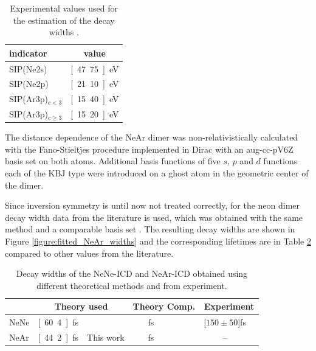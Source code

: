 \begin{table}[h]
 \caption{Experimental values used for the estimation of the decay widths
          \cite{Fasshauer14_1}.}
 \label{exp_input}
 \centering
 \begin{tabular}{lc}
  \toprule
  indicator            &  value \\
  \midrule
  SIP(Ne2s)            &  \unit[47.75]{eV} \\
  SIP(Ne2p)            &  \unit[21.10]{eV} \\
  SIP(Ar3p)$_{c<3}$    &  \unit[15.40]{eV} \\
  SIP(Ar3p)$_{c\ge 3}$ &  \unit[15.20]{eV} \\
  \bottomrule
 \end{tabular}
\end{table}

The distance dependence of the NeAr dimer was non-relativistically calculated with
the Fano-Stieltjes procedure implemented in Dirac \cite{DIRAC13,Fasshauer14_2}
with an aug-cc-pV6Z basis set on both atoms. 
Additional basis functions of five $s$, $p$ and $d$ functions each of the
KBJ type \cite{Kaufmann89} were introduced on a ghost atom in the
geometric center of the dimer.

Since inversion symmetry is until now not treated correctly,
for the neon dimer decay width data from the literature is used, which was
obtained with the same method and a comparable basis set \cite{Averbukh06_1}.
The resulting decay widths are shown in Figure \ref{figure:fitted_NeAr_widths}
and the corresponding lifetimes are in Table \ref{table:NeAr_gammas} compared
to other values from the literature.

\begin{table}[htb]
 \centering
 \caption{Decay widths of the NeNe-ICD and NeAr-ICD obtained
          using different theoretical
          methods and from experiment.}
 \begin{tabular}{lcrcrcr}
  \toprule
        & \multicolumn{2}{c}{Theory used} & \multicolumn{2}{c}{Theory Comp.} & \multicolumn{2}{c}{Experiment} \\
  \midrule
   NeNe & \unit[60.4]{fs} & \cite{Averbukh06_1} & \unit[92]{fs} & \cite{Vaval07} & \unit[$150\pm 50$]{fs} & \cite{Schnorr13}\\
   NeAr & \unit[44.2]{fs} & This work & \unit[36]{fs} & \cite{Scheit06} &  --  &\\
  \bottomrule
 \end{tabular}
 \label{table:NeAr_gammas}
\end{table}

